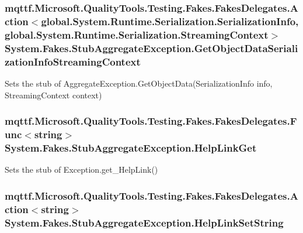 \hypertarget{class_system_1_1_fakes_1_1_stub_aggregate_exception_acf3c4e74c7c03a0abb84bfbade5dba33}{
\subsubsection[{Get\-Object\-Data\-Serialization\-Info\-Streaming\-Context}]{\setlength{\rightskip}{0pt plus 5cm}mqttf.\-Microsoft.\-Quality\-Tools.\-Testing.\-Fakes.\-Fakes\-Delegates.\-Action$<$global.\-System.\-Runtime.\-Serialization.\-Serialization\-Info, global.\-System.\-Runtime.\-Serialization.\-Streaming\-Context$>$ System.\-Fakes.\-Stub\-Aggregate\-Exception.\-Get\-Object\-Data\-Serialization\-Info\-Streaming\-Context}}\label{class_system_1_1_fakes_1_1_stub_aggregate_exception_acf3c4e74c7c03a0abb84bfbade5dba33}


Sets the stub of Aggregate\-Exception.\-Get\-Object\-Data(\-Serialization\-Info info, Streaming\-Context context)

\hypertarget{class_system_1_1_fakes_1_1_stub_aggregate_exception_a3f314c9aa528c855000e78d45acc979e}{
\subsubsection[{Help\-Link\-Get}]{\setlength{\rightskip}{0pt plus 5cm}mqttf.\-Microsoft.\-Quality\-Tools.\-Testing.\-Fakes.\-Fakes\-Delegates.\-Func$<$string$>$ System.\-Fakes.\-Stub\-Aggregate\-Exception.\-Help\-Link\-Get}}\label{class_system_1_1_fakes_1_1_stub_aggregate_exception_a3f314c9aa528c855000e78d45acc979e}


Sets the stub of Exception.\-get\-\_\-\-Help\-Link()

\hypertarget{class_system_1_1_fakes_1_1_stub_aggregate_exception_a566f008c3c49d125fb47fa988f830e3d}{
\subsubsection[{Help\-Link\-Set\-String}]{\setlength{\rightskip}{0pt plus 5cm}mqttf.\-Microsoft.\-Quality\-Tools.\-Testing.\-Fakes.\-Fakes\-Delegates.\-Action$<$string$>$ System.\-Fakes.\-Stub\-Aggregate\-Exception.\-Help\-Link\-Set\-String}}\label{class_system_1_1_fakes_1_1_stub_aggregate_exception_a566f008c3c49d125fb47fa988f830e3d}


